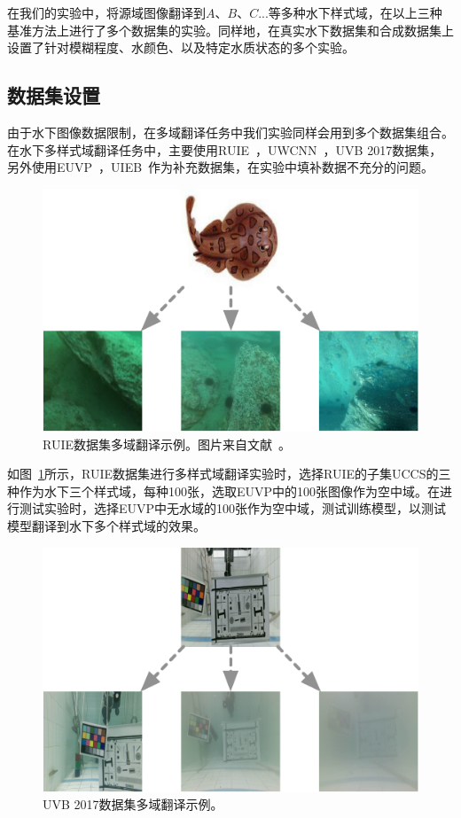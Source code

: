 在我们的实验中，将源域图像翻译到$A$、$B$、$C$...等多种水下样式域，在以上三种基准方法上进行了多个数据集的实验。同样地，在真实水下数据集和合成数据集上设置了针对模糊程度、水颜色、以及特定水质状态的多个实验。

\subsection{数据集设置}
由于水下图像数据限制，在多域翻译任务中我们实验同样会用到多个数据集组合。在水下多样式域翻译任务中，主要使用RUIE~\cite{liu2019real}，UWCNN~\cite{li2020underwater}，UVB 2017数据集，另外使用EUVP~\cite{islam2020fast}，UIEB~\cite{li2019underwater}作为补充数据集，在实验中填补数据不充分的问题。

\begin{figure}[ht]
    \centering
  \includegraphics[width=\textwidth]{figures/RUIE_dataset_domain.pdf}
  \caption{RUIE数据集多域翻译示例。图片来自文献~\cite{liu2019real,islam2020fast}。}
  \label{fig:ruie_domain}
\end{figure}

如图~\ref{fig:ruie_domain}所示，RUIE数据集进行多样式域翻译实验时，选择RUIE的子集UCCS的三种作为水下三个样式域，每种100张，选取EUVP中的100张图像作为空中域。在进行测试实验时，选择EUVP中无水域的100张作为空中域，测试训练模型，以测试模型翻译到水下多个样式域的效果。

\begin{figure}[ht]
    \centering
  \includegraphics[width=\textwidth]{figures/UVB_dataset_domain.pdf}
  \caption{UVB 2017数据集多域翻译示例。}
  \label{fig:uvb_domain}
\end{figure}


